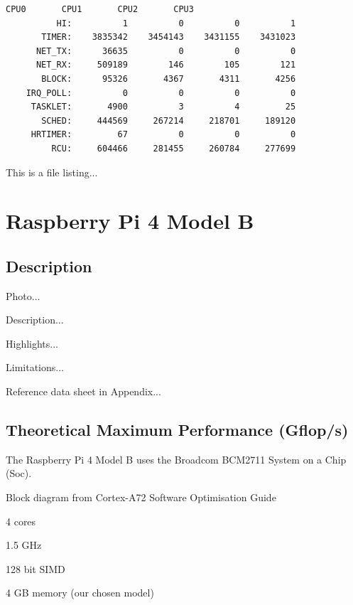 \documentclass{article}
\begin{document}
\lstset{style=termstyle}
\begin{lstlisting}[caption=cat /proc/softirqs]
                    CPU0       CPU1       CPU2       CPU3       
          HI:          1          0          0          1
       TIMER:    3835342    3454143    3431155    3431023
      NET_TX:      36635          0          0          0
      NET_RX:     509189        146        105        121
       BLOCK:      95326       4367       4311       4256
    IRQ_POLL:          0          0          0          0
     TASKLET:       4900          3          4         25
       SCHED:     444569     267214     218701     189120
     HRTIMER:         67          0          0          0
         RCU:     604466     281455     260784     277699
\end{lstlisting}

This is a file listing...

\lstset{style=listingstyle}




\section{Raspberry Pi 4 Model B}

\subsection{Description}

Photo...

Description...

Highlights...

Limitations...

Reference data sheet in Appendix...



\subsection{Theoretical Maximum Performance (Gflop/s)}

The Raspberry Pi 4 Model B uses the Broadcom BCM2711 System on a Chip (Soc).

Block diagram from Cortex-A72 Software Optimisation Guide

4 cores

1.5 GHz

128 bit SIMD

4 GB memory (our chosen model)
\end{document}

